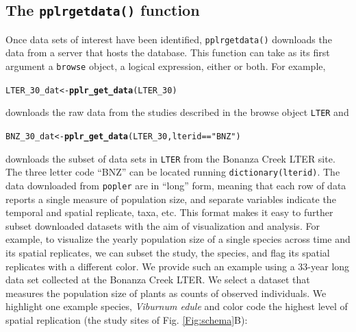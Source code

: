 \documentclass{article}\usepackage[]{graphicx}\usepackage[]{color}
\makeatletter
\newcommand{\hlstr}[1]{\textcolor[rgb]{0.192,0.494,0.8}{#1}}%
\newcommand{\hlopt}[1]{\textcolor[rgb]{0,0,0}{#1}}%
\newcommand{\hlstd}[1]{\textcolor[rgb]{0.345,0.345,0.345}{#1}}%
\newcommand{\hlkwb}[1]{\textcolor[rgb]{0.69,0.353,0.396}{#1}}%
\newcommand{\hlkwd}[1]{\textcolor[rgb]{0.737,0.353,0.396}{\textbf{#1}}}%
\newenvironment{kframe}{%
 \def\at@end@of@kframe{}%
 \ifinner\ifhmode%
  \def\at@end@of@kframe{\end{minipage}}%
  \begin{minipage}{\columnwidth}%
 \fi\fi%
 \def\FrameCommand##1{\hskip\@totalleftmargin \hskip-\fboxsep
 \colorbox{shadecolor}{##1}\hskip-\fboxsep
     \hskip-\linewidth \hskip-\@totalleftmargin \hskip\columnwidth}%
 \MakeFramed {\advance\hsize-\width
   \@totalleftmargin\z@ \linewidth\hsize
   \@setminipage}}%
 {\par\unskip\endMakeFramed%
 \at@end@of@kframe}
\newenvironment{knitrout}{}{} %
\makeatother
\begin{document}
\subsection*{The \texttt{pplr\textunderscore get\textunderscore data()} function}

Once data sets of interest have been identified, \texttt{pplr\textunderscore get\textunderscore data()} downloads the data from a server that hosts the database. This function can take as its first argument a \texttt{browse} object, a logical expression, either or both. For example, %
\begin{knitrout}
\color{fgcolor}\begin{kframe}
\begin{alltt}
\hlstd{LTER_30_dat} \hlkwb{<-} \hlkwd{pplr_get_data}\hlstd{(LTER_30)}
\end{alltt}
\end{kframe}
\end{knitrout}
downloads the raw data from the studies described in the browse object \texttt{LTER} and 
\begin{knitrout}
\color{fgcolor}\begin{kframe}
\begin{alltt}
\hlstd{BNZ_30_dat} \hlkwb{<-} \hlkwd{pplr_get_data}\hlstd{(LTER_30,lterid} \hlopt{==} \hlstr{"BNZ"}\hlstd{)}
\end{alltt}
\end{kframe}
\end{knitrout}
downloads the subset of data sets in \texttt{LTER} from the Bonanza Creek LTER site. The three letter code ``BNZ'' can be located running \texttt{dictionary(lterid)}. The data downloaded from \texttt{popler} are in ``long'' form, meaning that each row of data reports a single measure of population size, and separate variables indicate the temporal and spatial replicate, taxa, etc. This format makes it easy to further subset downloaded datasets with the aim of visualization and analysis. For example, to visualize the yearly population size of a single species across time and its spatial replicates, we can subset the study, the species, and flag its spatial replicates with a different color. We provide such an example using a 33-year long data set collected at the Bonanza Creek LTER. We select a dataset that measures the population size of plants as counts of observed individuals. We highlight one example species, \textit{Viburnum edule} and color code the highest level of spatial replication (the study sites of Fig. \ref{Fig:schema}B):
\end{document}
